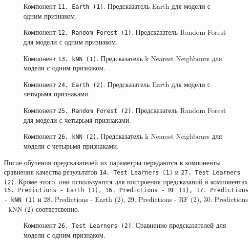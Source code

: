 \begin{figure}[H]
    \caption{Компонент \texttt{11. Earth (1)}. Предсказатель Earth для модели с одним признаком.}
    \label{img:11-Earth-1}
\end{figure}

\begin{figure}[H]
    \center{\texttt{[image: 12-RF-1]}}
    \caption{Компонент \texttt{12. Random Forest (1)}. Предсказатель Random Forest для модели с одним признаком.}
    \label{img:12-RF-1}
\end{figure}

\begin{figure}[H]
    \caption{Компонент \texttt{13. kNN (1)}. Предсказатель k Nearest Neighbours для модели с одним признаком.}
    \label{img:13-kNN-1}
\end{figure}

\begin{figure}[H]
    \caption{Компонент \texttt{24. Earth (2)}. Предсказатель Earth для модели с четырьмя признаками.}
    \label{img:24-Earth-2}
\end{figure}

\begin{figure}[H]
    \center{\texttt{[image: 25-RF-2]}}
    \caption{Компонент \texttt{25. Random Forest (2)}. Предсказатель Random Forest для модели с четырьмя признаками.}
    \label{img:25-RF-2}
\end{figure}

\begin{figure}[H]
    \caption{Компонент \texttt{26. kNN (2)}. Предсказатель k Nearest Neighbours для модели с четырьмя признаками.}
    \label{img:26-kNN-2}
\end{figure}

После обучения предсказателей их параметры передаются в компоненты сравнения качества результатов \texttt{14. Test Learners (1)} и \texttt{27. Test Learners (2)}. Кроме этого, они используются для построения предсказаний в компонентах \texttt{15. Predictions - Earth (1), 16. Predictions - RF (1), 17. Predictions - kNN (1)} и {28. Predictions - Earth (2), 29. Predictions - RF (2), 30. Predictions - kNN (2)} соответсвенно.

\begin{figure}[H]
    \caption{Компонент \texttt{26. Test Learners (2)}. Сравнение предсказателей для модели с одним признаком.}
    \label{img:14-Test-Learners-1}
\end{figure}

